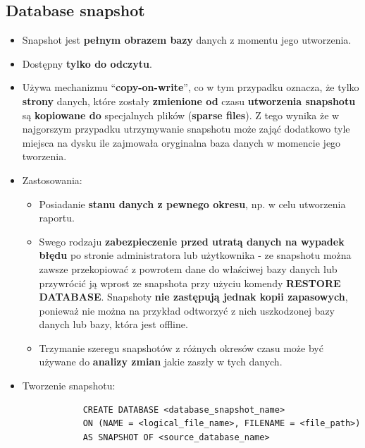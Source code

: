 \documentclass[a4paper]{article}
\begin{document}
    \subsection{Database snapshot}
    \begin{itemize}[noitemsep]
        \item Snapshot jest \textbf{pełnym obrazem bazy} danych z momentu jego utworzenia.
        \item Dostępny \textbf{tylko do odczytu}.
        \item Używa mechanizmu ``\textbf{copy-on-write}'', co w tym przypadku oznacza, że tylko \textbf{strony} danych,
        które zostały \textbf{zmienione od} czasu \textbf{utworzenia snapshotu} są \textbf{kopiowane do} specjalnych
        plików (\textbf{sparse files}). Z tego wynika że w najgorszym przypadku utrzymywanie snapshotu może zająć
        dodatkowo tyle miejsca na dysku ile zajmowała oryginalna baza danych w momencie jego tworzenia.
        \item Zastosowania:
        \begin{itemize}[noitemsep]
            \item Posiadanie \textbf{stanu danych z pewnego okresu}, np. w celu utworzenia raportu.
            \item Swego rodzaju \textbf{zabezpieczenie przed utratą danych na wypadek błędu} po stronie administratora
            lub użytkownika - ze snapshotu można zawsze przekopiować z powrotem dane do właściwej bazy danych lub
            przywrócić ją wprost ze snapshota przy użyciu komendy \textbf{RESTORE DATABASE}. Snapshoty \textbf{nie
            zastępują jednak kopii zapasowych}, ponieważ nie można na przykład odtworzyć z nich uszkodzonej bazy danych
            lub bazy, która jest offline.
            \item Trzymanie szeregu snapshotów z różnych okresów czasu może być używane do \textbf{analizy zmian} jakie
            zaszły w tych danych.
        \end{itemize}
        \item Tworzenie snapshotu:
        \begin{verbatim}
            CREATE DATABASE <database_snapshot_name>
            ON (NAME = <logical_file_name>, FILENAME = <file_path>)
            AS SNAPSHOT OF <source_database_name>
        \end{verbatim}
    \end{itemize}
\end{document}
